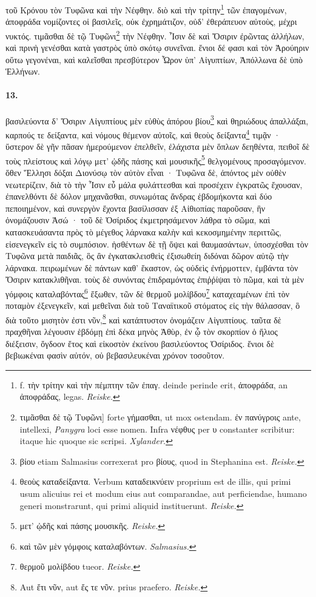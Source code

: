 \documentclass[a4paper, 11pt, oneside, polutonikogreek, german]{article}
\begin{document}
τοῦ Κρόνου τὸν Τυφῶνα καὶ τὴν Νέφθην. διὸ καὶ τὴν τρίτην\footnote{f. τὴν τρίτην καὶ τὴν πέμπτην τῶν ἐπαγ. deinde perinde erit, ἀποφράδα, an ἀποφράδας, legas. \emph{Reiske.}} τῶν ἐπαγομένων, ἀποφράδα νομίζοντες οἱ βασιλεῖς, οὐκ ἐχρημάτιζον, οὐδ' ἐθεράπευον αὐτοὺς, μέχρι νυκτός. τιμᾶσθαι δὲ τῷ Τυφῶνι\footnote{τιμᾶσθαι δὲ τῷ Τυφῶνι] forte γήμασθαι, ut mox ostendam. ἐν πανύγροις ante, intellexi, \emph{Panygra} loci esse nomen. Infra νέφθυς per υ constanter scribitur: itaque hic quoque sic scripsi. \emph{Xylander.}} τὴν Νέφθην. Ἶσιν δὲ καὶ Ὄσιριν ἐρῶντας ἀλλήλων, καὶ πρινὴ γενέσθαι κατὰ γαστρὸς ὑπὸ σκότῳ συνεῖναι. ἔνιοι δέ φασι καὶ τὸν Ἀρούηριν οὕτω γεγονέναι, καὶ καλεῖσθαι πρεσβύτερον Ὦρον ὑπ' Αἰγυπτίων, Ἀπόλλωνα δὲ ὑπὸ Ἑλλήνων.

\paragraph{13.}
βασιλεύοντα δ' Ὄσιριν Αἰγυπτίους μὲν εὐθὺς ἀπόρου βίου\footnote{βίου etiam Salmasius correxerat pro βίους, quod in Stephanina est. \emph{Reiske.}} καὶ θηριώδους ἀπαλλάξαι, καρπούς τε δείξαντα, καὶ νόμους θέμενον αὐτοῖς, καὶ θεοὺς δείξαντα\footnote{θεοὺς καταδείξαντα. Verbum καταδεικνύειν proprium est de illis, qui primi usum alicuius rei et modum eius aut comparandae, aut perficiendae, humano generi monstrarunt, qui primi aliquid instituerunt. \emph{Reiske.}} τιμᾷν · ὕστερον δὲ γῆν πᾶσαν ἡμερούμενον ἐπελθεῖν, ἐλάχιστα μὲν ὅπλων δεηθέντα, πειθοῖ δὲ τοὺς πλείστους καὶ λόγῳ μετ' ᾠδῆς πάσης καὶ μουσικῆς\footnote{μετ' ᾠδῆς καὶ πάσης μουσικῆς. \emph{Reiske.}} θελγομένους προσαγόμενον. ὅθεν Ἕλλησι δόξαι Διονύσῳ τὸν αὐτὸν εἶναι · Τυφῶνα δὲ, ἀπόντος μὲν οὐθὲν νεωτερίζειν, διὰ τὸ τὴν Ἶσιν εὖ μάλα φυλάττεσθαι καὶ προσέχειν ἐγκρατῶς ἔχουσαν, ἐπανελθόντι δὲ δόλον μηχανᾶσθαι, συνωμότας ἄνδρας ἑβδομήκοντα καὶ δύο πεποιημένον, καὶ συνεργὸν ἔχοντα βασίλισσαν ἐξ Αἰθιοπίας παροῦσαν, ἣν ὀνομάζουσιν Ἀσώ · τοῦ δὲ Ὀσίριδος ἐκμετρησάμενον λάθρα τὸ σῶμα, καὶ κατασκευάσαντα πρὸς τὸ μέγεθος λάρνακα καλὴν καὶ κεκοσμημένην περιττῶς, εἰσενεγκεῖν εἰς τὸ συμπόσιον. ἡσθέντων δὲ τῇ ὄψει καὶ θαυμασάντων, ὑποσχέσθαι τὸν Τυφῶνα μετὰ παιδιᾶς, ὃς ἂν ἐγκατακλεισθεὶς ἐξισωθείη διδόναι δῶρον αὐτῷ τὴν λάρνακα. πειρωμένων δὲ πάντων καθ' ἕκαστον, ὡς οὐδεὶς ἐνήρμοττεν, ἐμβάντα τὸν Ὄσιριν κατακλιθῆναι. τοὺς δὲ συνόντας ἐπιδραμόντας ἐπιῤῥίψαι τὸ πῶμα, καὶ τὰ μὲν γόμφοις καταλαβόντας\footnote{καὶ τῶν μὲν γόμφοις καταλαβόντων. \emph{Salmasius.}} ἔξωθεν, τῶν δὲ θερμοῦ μολίβδου\footnote{θερμοῦ μολίβδου tueor. \emph{Reiske.}} καταχεαμένων ἐπὶ τὸν ποταμὸν ἐξενεγκεῖν, καὶ μεθεῖναι διὰ τοῦ Ταναϊτικοῦ στόματος εἰς τὴν θάλασσαν, ὃ διὰ τοῦτο μισητὸν ἐστι νῦν,\footnote{Aut ἔτι νῦν, aut ἔς τε νῦν. prius praefero. \emph{Reiske.}} καὶ κατάπτυστον ὀνομάζειν Αἰγυπτίους. ταῦτα δὲ πραχθῆναι λέγουσιν ἑβδόμῃ ἐπὶ δέκα μηνὸς Ἀθὺρ, ἐν ᾧ τὸν σκορπίον ὁ ἥλιος διέξεισιν, ὄγδοον ἔτος καὶ εἰκοστὸν ἐκείνου βασιλεύοντος Ὀσίριδος. ἔνιοι δὲ βεβιωκέναι φασὶν αὐτόν, οὐ βεβασιλευκέναι χρόνον τοσοῦτον.
\end{document}
